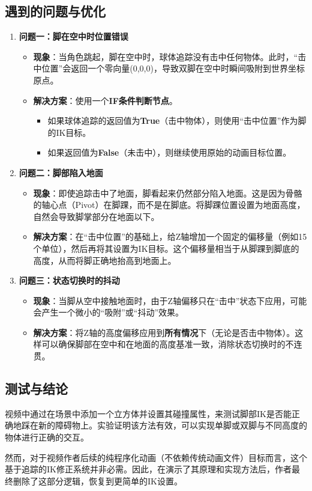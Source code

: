 \documentclass[10.5pt,a4paper]{ZBook}
\begin{document}
\subsection{遇到的问题与优化}
\begin{enumerate}
    \item \textbf{问题一：脚在空中时位置错误}
    \begin{itemize}
        \item \textbf{现象}：当角色跳起，脚在空中时，球体追踪没有击中任何物体。此时，“击中位置”会返回一个零向量(0,0,0)，导致双脚在空中时瞬间吸附到世界坐标原点。
        \item \textbf{解决方案}：使用一个\textbf{IF条件判断节点}。
        \begin{itemize}
            \item 如果球体追踪的返回值为\textbf{True}（击中物体），则使用“击中位置”作为脚的IK目标。
            \item 如果返回值为\textbf{False}（未击中），则继续使用原始的动画目标位置。
        \end{itemize}
    \end{itemize}

    \item \textbf{问题二：脚部陷入地面}
    \begin{itemize}
        \item \textbf{现象}：即使追踪击中了地面，脚看起来仍然部分陷入地面。这是因为骨骼的轴心点（Pivot）在脚踝，而不是在脚底。将脚踝位置设置为地面高度，自然会导致脚掌部分在地面以下。
        \item \textbf{解决方案}：在“击中位置”的基础上，给Z轴增加一个固定的偏移量（例如15个单位），然后再将其设置为IK目标。这个偏移量相当于从脚踝到脚底的高度，从而将脚正确地抬高到地面上。
    \end{itemize}

    \item \textbf{问题三：状态切换时的抖动}
    \begin{itemize}
        \item \textbf{现象}：当脚从空中接触地面时，由于Z轴偏移只在“击中”状态下应用，可能会产生一个微小的“吸附”或“抖动”效果。
        \item \textbf{解决方案}：将Z轴的高度偏移应用到\textbf{所有情况}下（无论是否击中物体）。这样可以确保脚部在空中和在地面的高度基准一致，消除状态切换时的不连贯。
    \end{itemize}
\end{enumerate}

\subsection{测试与结论}
视频中通过在场景中添加一个立方体并设置其碰撞属性，来测试脚部IK是否能正确地踩在新的障碍物上。实验证明该方法有效，可以实现单脚或双脚与不同高度的物体进行正确的交互。

然而，对于视频作者后续的纯程序化动画（不依赖传统动画文件）目标而言，这个基于追踪的IK修正系统并非必需。因此，在演示了其原理和实现方法后，作者最终删除了这部分逻辑，恢复到更简单的IK设置。
\end{document}
